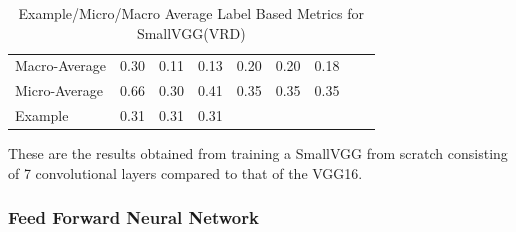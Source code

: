 \documentclass{csfyp}
\begin{document}
\begin{table}[!htbp]
\begin{tabular}{|l|l|l|l|l|l|l|l|l}
Macro-Average&	0.30	&	0.11	&	0.13	&	0.20	&	0.20	&	0.18 \\ \cline{1-7}
Micro-Average&	0.66	&	0.30	&	0.41	&	0.35	&	0.35	&	0.35  \\ \cline{1-7}
Example      &	0.31	&	0.31	&	0.31	  \\ \cline{1-4}
\end{tabular}
\caption{Example/Micro/Macro Average Label Based Metrics for SmallVGG(VRD)}
These are the results obtained from training a SmallVGG from scratch consisting of 7 convolutional layers compared to that of the VGG16.
\vspace{-4mm}
\end{table}

\newpage
\subsubsection{Feed Forward Neural Network}
\end{document}
